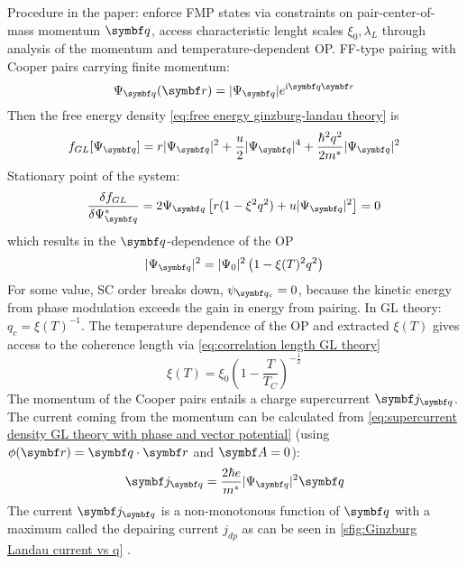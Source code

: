 \documentclass[../notes.tex]{subfiles}
\begin{document}
Procedure in the paper: enforce FMP states via constraints on pair-center-of-mass momentum \(\vb{q}\), access characteristic lenght scales \(\xi_0, \lambda_L\) through analysis of the momentum and temperature-dependent OP\@.
FF-type pairing with Cooper pairs carrying finite momentum:
\begin{equation}
	\Psi_{\vb{q}} (\vb{r}) = \vert \Psi_{\vb{q}} \vert e^{\iu \vb{q} \vb{r}}
\end{equation}
Then the free energy density \cref{eq:free energy ginzburg-landau theory} is
\begin{equation}
	f_{GL} [\Psi_{\vb{q}}] = r \vert \Psi_{\vb{q}} \vert^2 + \frac{u}{2} \vert \Psi_{\vb{q}} \vert^4 + \frac{\hbar^2 q^2}{2 m^*} \vert \Psi_{\vb{q}} \vert^2
\end{equation}
Stationary point of the system:
\begin{equation}
	\fdv{f_{GL}}{\Psi_{\vb{q}}^*} = 2 \Psi_{\vb{q}} \left[r (1 - \xi^2 q^2) + u \vert \Psi_{\vb{q}} \vert^2\right] = 0
\end{equation}
which results in the \(\vb{q}\)-dependence of the OP
\begin{equation}
	\vert \Psi_{\vb{q}} \vert^2 = \vert \Psi_{0} \vert^2 \left(1 - \xi(T)^2 q^2\right)
\end{equation}
For some value, SC order breaks down, \(\psi_{\vb{q}_c} = 0\), because the kinetic energy from phase modulation exceeds the gain in energy from pairing.
In GL theory: \(q_c = \xi(T)^{-1}\).
The temperature dependence of the OP and extracted \(\xi(T)\) gives access to the coherence length via \cref{eq:correlation length GL theory}
\begin{equation}
	\xi(T) = \xi_0 \left(1 - \frac{T}{T_C}\right)^{-\frac{1}{2}}
\end{equation}
The momentum of the Cooper pairs entails a charge supercurrent \(\vb{j}_{\vb{q}}\).
The current coming from the momentum can be calculated from \cref{eq:supercurrent density GL theory with phase and vector potential} (using \(\phi(\vb{r}) = \vb{q} \cdot \vb{r}\) and \(\vb{A} = 0\)):
\begin{equation}
	\vb{j}_{\vb{q}} = \frac{2 \hbar e}{m^*} \vert \Psi_{\vb{q}} \vert^2 \vb{q}
\end{equation}
The current \(\vb{j}_{\vb{q}}\) is a non-monotonous function of \(\vb{q}\) with a maximum called the depairing current \(j_{dp}\) as can be seen in \cref{sfig:Ginzburg Landau current vs q} .
\end{document}
